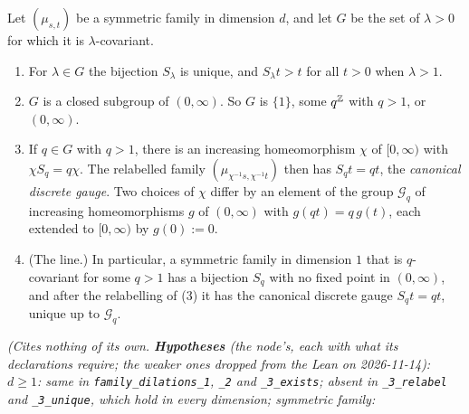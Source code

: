 \begin{lemma}
\label{lem:family-dilations}
\leanok
{}
Let $(\mu_{s,t})$ be a symmetric family in dimension $d$, and let $G$ be the set of $\lambda > 0$ for
which it is $\lambda$-covariant.
\begin{enumerate}
\item For $\lambda \in G$ the bijection $S_\lambda$ is unique, and $S_\lambda t > t$ for all $t > 0$
when $\lambda > 1$.
\item $G$ is a closed subgroup of $(0,\infty)$. So $G$ is $\{1\}$, some $q^{\mathbb{Z}}$ with $q > 1$, or
$(0,\infty)$.
\item If $q \in G$ with $q > 1$, there is an increasing homeomorphism $\chi$ of $[0,\infty)$ with
$\chi S_q = q\chi$. The relabelled family $(\mu_{\chi^{-1}s,\chi^{-1}t})$ then has $S_qt = qt$, the
\emph{canonical discrete gauge}. Two choices of $\chi$ differ by an element of the group
$\mathcal{G}_q$ of increasing homeomorphisms $g$ of $(0,\infty)$ with $g(qt) = q\,g(t)$, each
extended to $[0,\infty)$ by $g(0) := 0$.
\item (The line.) In particular, a symmetric family in dimension $1$ that is $q$-covariant for some
$q > 1$ has a bijection $S_q$ with no fixed point in $(0,\infty)$, and after the relabelling of (3)
it has the canonical discrete gauge $S_qt = qt$, unique up to $\mathcal{G}_q$.
\end{enumerate}
\statusT\quad\emph{(Cites nothing of its own. \textbf{Hypotheses} (the node's, each with what its
declarations require; the weaker ones dropped from the Lean on 2026-11-14): $d \ge 1$: same in
\texttt{family\_dilations\_1}, \texttt{\_2} and \texttt{\_3\_exists}; absent in
\texttt{\_3\_relabel} and \texttt{\_3\_unique}, which hold in every dimension; symmetric family:
}
\end{lemma}
